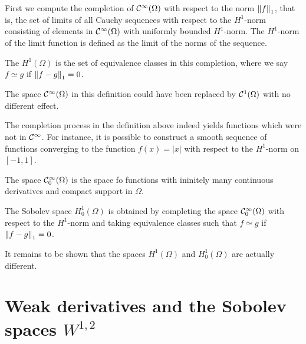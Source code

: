 \begin{definition}
  First we compute the completion of
  $\mathcal C^\infty(\Omega)$ with respect to the norm $\left\|f\right\|_1$, that is,
  the set of limits of all Cauchy sequences with respect to the
  $H^1$-norm consisting of elements in $\mathcal C^\infty(\Omega)$ with
  uniformly bounded $H^1$-norm. The $H^1$-norm of the limit function
  is defined as the limit of the norms of the sequence.
  
  The  $H^1(\Omega)$ is the set of equivalence classes in
  this completion, where we say $f\simeq g$ if $\left\|f-g\right\|_1=0$.
\end{definition}

\begin{note}
  The space $\mathcal C^\infty(\Omega)$ in this definition could have been
  replaced by $\mathcal C^1(\Omega)$ with no different effect.
\end{note}

\begin{example}
  The completion process in the definition above indeed yields
  functions which were not in $\mathcal C^\infty$. For instance, it is
  possible to construct a smooth sequence of functions converging to
  the function $f(x) = |x|$ with respect to the $H^1$-norm on $[-1,1]$.
\end{example}

\begin{definition}
  The space $\mathcal C^\infty_0(\Omega)$ is the space fo functions with
  ininitely many continuous derivatives and compact support in
  $\Omega$.
\end{definition}

\begin{definition}
  The Sobolev space $H^1_0(\Omega)$ is obtained by completing the
  space $\mathcal C^\infty_0(\Omega)$ with respect to the $H^1$-norm and
  taking equivalence classes such that $f\simeq g$ if $\left\|f-g\right\|_1=0$.
\end{definition}

\begin{note}
  It remains to be shown that the spaces $H^1(\Omega)$ and
  $H^1_0(\Omega)$ are actually different.
\end{note}
\section{Weak derivatives and the Sobolev spaces $W^{1,2}$}
\label{sec:weak-derivatives}


